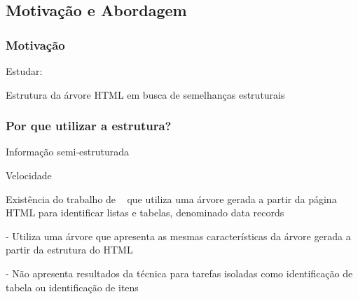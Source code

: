\documentclass{beamer}
\newenvironment{my_itemize}{
\begin{itemize}
  \setlength{\itemsep}{5pt}
  \setlength{\parskip}{2pt}
  \setlength{\parsep}{3pt}
}{\end{itemize}}
\begin{document}
\subsection{Motivação e Abordagem}
\begin{frame}
\frametitle{Motivação}
  \begin{my_itemize}
    \item Estudar:
    \begin{my_itemize}
      \item Estrutura da árvore HTML em busca de semelhanças estruturais
    \end{my_itemize}

    \begin{my_itemize}





    \end{my_itemize}
  

  \end{my_itemize}
\end{frame}

\begin{frame}
\frametitle{Por que utilizar a estrutura?}

  \begin{my_itemize}
  \item Informação semi-estruturada
  \item Velocidade
  \pause
  \item Existência do trabalho de ~\cite{Zhai2005} que utiliza uma árvore
  gerada a partir da página HTML para identificar listas e tabelas,
  denominado data records
    \begin{my_itemize}
    \item[-] Utiliza uma árvore que apresenta as mesmas
    características da árvore gerada a partir da estrutura do HTML
    \item[-] Não apresenta resultados da técnica para tarefas isoladas como
    identificação de tabela ou identificação de itens
    \end{my_itemize}
  \end{my_itemize}

\end{frame}
\end{document}

